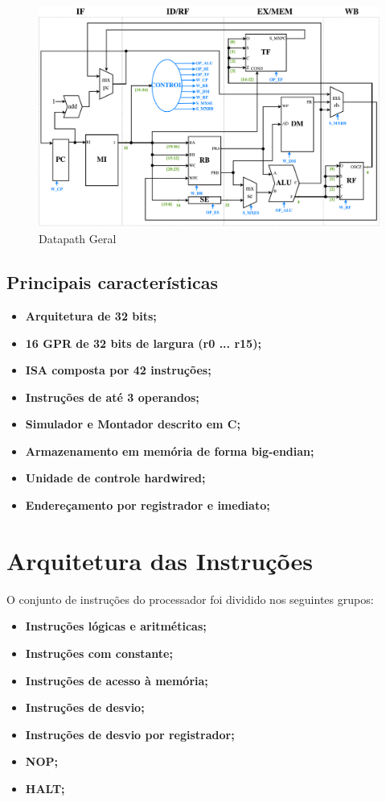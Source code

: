 \documentclass{report}
\begin{document}
\begin{figure}[H]
\centering
\includegraphics[width=\textwidth]{./pictures/Datapath.pdf}
\caption{Datapath Geral}
\end{figure}

\subsection{Principais características}
\begin{itemize}
    \item \textbf {Arquitetura de 32 bits;}
    \item \textbf {16 GPR de 32 bits de largura (r0 ... r15);}
    \item \textbf {ISA composta por 42 instruções;}
    \item \textbf {Instruções de até 3 operandos;}
    \item \textbf {Simulador e Montador descrito em C;}
    \item \textbf {Armazenamento em memória de forma big-endian;}
    \item \textbf {Unidade de controle hardwired;}
    \item \textbf {Endereçamento por registrador e imediato;}
\end{itemize}

\newpage
\section{Arquitetura das Instruções}
O conjunto de instruções do processador foi dividido nos seguintes grupos:\newline
\begin{itemize}
    \item \textbf {Instruções lógicas e aritméticas;}
    \item \textbf {Instruções com constante;}
    \item \textbf {Instruções de acesso à memória;}
    \item \textbf {Instruções de desvio;}
    \item \textbf {Instruções de desvio por registrador;}
    \item \textbf {NOP;}
    \item \textbf {HALT;}
\end{itemize}
\end{document}

